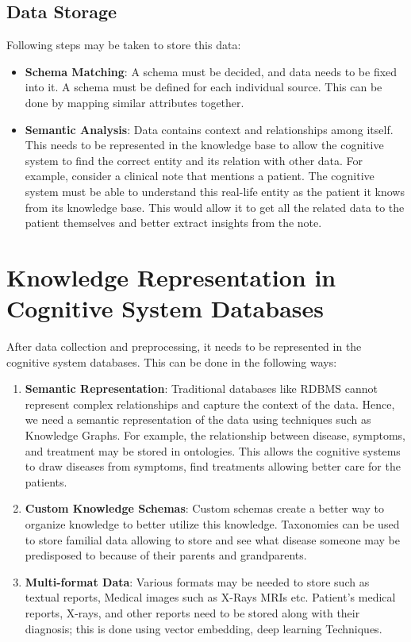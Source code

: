 \documentclass[12pt]{report}
\begin{document}
\subsection{Data Storage}

Following steps may be taken to store this data:

\begin{itemize}
  \item \textbf{Schema Matching}: A schema must be decided, and data needs to
    be fixed into it. A schema must be defined for each individual source. This
    can be done by mapping similar attributes together.
  \item \textbf{Semantic Analysis}: Data contains context and relationships
    among itself. This needs to be represented in the knowledge base to allow
    the cognitive system to find the correct entity and its relation with other
    data. For example, consider a clinical note that mentions a patient. The
    cognitive system must be able to understand this real-life entity as the
    patient it knows from its knowledge base. This would allow it to get all
    the related data to the patient themselves and better extract insights from
    the note.
\end{itemize}

\section{Knowledge Representation in Cognitive System Databases}

After data collection and preprocessing, it needs to be represented in the
cognitive system databases. This can be done in the following ways:

\begin{enumerate}
  \item \textbf{Semantic Representation}: Traditional databases like RDBMS
    cannot represent complex relationships and capture the context of the data.
    Hence, we need a semantic representation of the data using techniques such
    as Knowledge Graphs. For example, the relationship between disease,
    symptoms, and treatment may be stored in ontologies. This allows the
    cognitive systems to draw diseases from symptoms, find treatments allowing
    better care for the patients.
  \item \textbf{Custom Knowledge Schemas}: Custom schemas create a better way
    to organize knowledge to better utilize this knowledge. Taxonomies can be
    used to store familial data allowing to store and see what disease someone
    may be predisposed to because of their parents and grandparents.
  \item \textbf{Multi-format Data}: Various formats may be needed to store such
    as textual reports, Medical images such as X-Rays MRIs etc. Patient's
    medical reports, X-rays, and other reports need to be stored along with
    their diagnosis; this is done using vector embedding, deep learning
    Techniques.
\end{enumerate}
\end{document}
